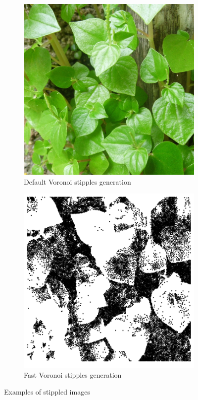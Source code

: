 \begin{figure}[!htb]
\begin{subfigure}[h]{0.4\linewidth}
\includegraphics[width=\linewidth]{images/leafs.jpg}
\caption{Default Voronoi stipples generation}
\end{subfigure}%
\hfill
\begin{subfigure}[h]{0.4\linewidth}
\includegraphics[width=\linewidth]{images/leafs_stippled.png}
\caption{Fast Voronoi stipples generation}
\end{subfigure}%
\caption{Examples of stippled images}
\label{comparison-fast}
\end{figure}

